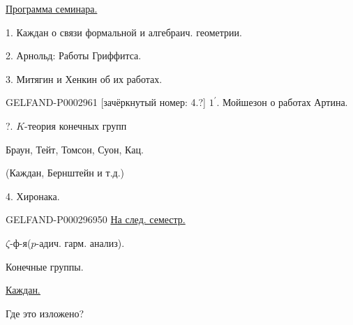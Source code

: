 \underline{Программа семинара.}

1. Каждан о связи формальной и алгебраич. геометрии.

2. Арнольд: Работы Гриффитса.

3. Митягин и Хенкин об их работах.

\begin{GelfandAdjacentEvidence}{GELFAND-P000296}{1}
[зачёркнутый номер: 4.?] $1^{\prime}$. Мойшезон о работах Артина.

\end{GelfandAdjacentEvidence}


?. $K$-теория конечных групп

\hfill Браун, Тейт, Томсон, Суон, Кац.

(Каждан, Бернштейн и т.д.)

4. Хиронака.

\begin{GelfandAdjacentEvidence}{GELFAND-P000296}{950}
\underline{На след. семестр.}

$\zeta$-ф-я\qquad($p$-адич. гарм. анализ).

Конечные группы.\end{GelfandAdjacentEvidence}

\begin{center}\end{center}

\underline{\underline{Каждан.}}

Где это изложено?





